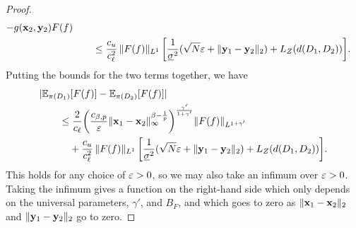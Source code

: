 \documentclass[12pt]{report}
\begin{document}
\begin{proof}
\begin{align}
{{{                - g(\vx_2, \vy_2)
            }
            F(f)
        }} \nonumber \\
        &\qquad
            \le 
            \frac{c_u}{c_\ell^2}
            \,\norm{F(f)}_{L^1}
            \,\sbrac*{
                \frac{1}{\underline{\sigma}^2}(
                    \sqrt{N}\e
                    + \norm{\vy_1 - \vy_2}_2
                )
                + L_Z(d(D_1, D_2))
            }.
    \end{align}
    Putting the bounds for the two terms together, we have
    \begin{align}
        &\abs{\E_{\pi(D_1)}[F(f)] - \E_{\pi(D_2)}[F(f)]} \nonumber \\
        &\qquad
            \le
            \frac{2}{c_\ell}
            \parens*{
                \frac{c_{\beta, p}}{\e} \norm{\vx_1 - \vx_2}_\infty^{\beta - \frac{1}{p}}
            }^{\frac{\gamma'}{1 + \gamma'}}
            \norm{F(f)}_{L^{1 + \gamma'}}
            \nonumber \\
        &\qquad\phantom{\le}\;
            + \frac{c_u}{c_\ell^2}\,\norm{F(f)}_{L^1}
            \,\sbrac*{
                \frac{1}{\underline{\sigma}^2}(
                    \sqrt{N}\e
                    + \norm{\vy_1 - \vy_2}_2
                )
                + L_Z(d(D_1, D_2))
            }.
    \end{align}
    This holds for any choice of $\varepsilon > 0$,
    so we may also take an infimum over $\varepsilon > 0$.
    Taking the infimum gives a function on the right-hand side which only depends on the universal parameters, $\gamma'$, and $B_F$, and which goes to zero as $\lVert\mathbf{x}_1 - \mathbf{x}_2\rVert_2$ and $\lVert\mathbf{y}_1 - \mathbf{y}_2\rVert_2$ go to zero.
\end{proof}
\end{document}
